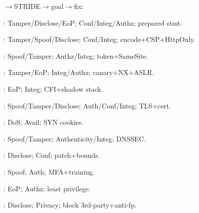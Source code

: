 {\fivept\sloppy
{}$\to$STRIDE$\to$goal$\to$fix:\par
{}: Tamper/Disclose/EoP; Conf/Integ/Authz; prepared stmt.\par
{}: Tamper/Spoof/Disclose; Conf/Integ; encode+CSP+HttpOnly.\par
{}: Spoof/Tamper; Authz/Integ; token+SameSite.\par
{}: Tamper/EoP; Integ/Authz; canary+NX+ASLR.\par
{}: EoP; Integ; CFI+shadow stack.\par
{}: Spoof/Tamper/Disclose; Auth/Conf/Integ; TLS+cert.\par
{}: DoS; Avail; SYN cookies.\par
{}: Spoof/Tamper; Authenticity/Integ; DNSSEC.\par
{}: Disclose; Conf; patch+bounds.\par
{}: Spoof; Auth; MFA+training.\par
{}: EoP; Authz; least privilege.\par
{}: Disclose; Privacy; block 3rd-party+anti-fp.\par
}
